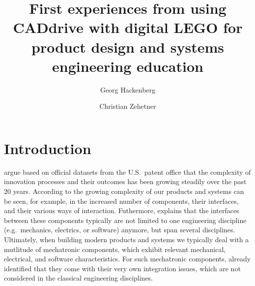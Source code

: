 \documentclass{PDS}
\begin{document}

\title[FIRST EXPERIENCES FROM USING CADDRIVE WITH DIGITAL LEGO]{First experiences from using CADdrive with digital LEGO for product design and systems engineering education}

\author[1]{Georg Hackenberg}
\author[1]{Christian Zehetner}


\address[1]{School of Engineering, University of Applied Sciences Upper Austria, Wels, Austria}




\maketitle

\section{Introduction}
\label{sec:introduction}

\cite{Luo_2017} argue based on official datasets from the U.S.\ patent office that the complexity of innovation processes and their outcomes has been growing steadily over the past 20 years.
According to \cite{Trattner_2019} the growing complexity of our products and systems can be seen, for example, in the increased number of components, their interfaces, and their various ways of interaction.
Futhermore, \cite{Thramboulidis_2008} explains that the interfaces between these components typically are not limited to one engineering discipline (e.g.\ mechanics, electrics, or software) anymore, but span several disciplines.
Ultimately, when building modern products and systems we typically deal with a mutlitude of mechatronic components, which exhibit relevant mechanical, electrical, and software characteristics.
For such mechatronic components, \cite{Youcef_Toumi_1996} already identified that they come with their very own integration issues, which are not considered in the classical engineering disciplines.
\end{document}
